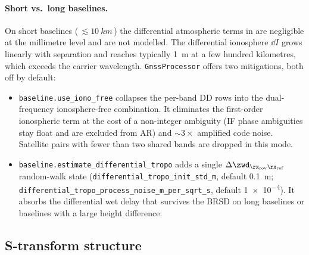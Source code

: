 \paragraph{Short vs.\ long baselines.}
On short baselines (\,$\lesssim \SI{10}{km}$\,) the differential atmospheric terms
in  are negligible at the millimetre level and are not modelled.
The differential ionosphere $\dd{I}$ grows linearly with separation and reaches
typically \SI{1}{m} at a few hundred kilometres, which exceeds the carrier
wavelength.  \texttt{GnssProcessor} offers two mitigations, both off by default:
\begin{itemize}[leftmargin=*, itemsep=0pt]
\item \texttt{baseline.use\_iono\_free} collapses the per-band DD rows into the
      dual-frequency ionosphere-free combination.  It eliminates the first-order
      ionospheric term at the cost of a non-integer ambiguity (IF phase ambiguities
      stay float and are excluded from AR) and $\sim 3\times$ amplified code noise.
      Satellite pairs with fewer than two shared bands are dropped in this mode.
\item \texttt{baseline.estimate\_differential\_tropo} adds a single
      $\Delta\zwd_{\rx_{\mathrm{rov}}\rx_{\mathrm{ref}}}$ random-walk state
      (\texttt{differential\_tropo\_init\_std\_m}, default \SI{0.1}{m};
      \texttt{differential\_tropo\_process\_noise\_m\_per\_sqrt\_s}, default
      \num{1e-4}).  It absorbs the differential wet delay that survives the BRSD on
      long baselines or baselines with a large height difference.
\end{itemize}

\subsection{S-transform structure}

